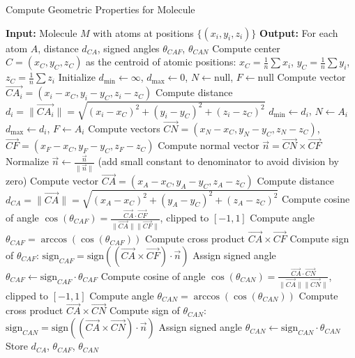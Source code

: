 \documentclass{article}
\begin{document}
\begin{algorithm}
\caption{Compute Geometric Properties for Molecule}
\begin{algorithmic}[1]
  \State \textbf{Input:} Molecule \( M \) with atoms at positions \( \{(x_i, y_i, z_i)\} \)
  \State \textbf{Output:} For each atom \( A \), distance \( d_{CA} \), signed angles \( \theta_{CAF} \), \( \theta_{CAN} \)
  \State Compute center \( C = (x_C, y_C, z_C) \) as the centroid of atomic positions: \( x_C = \frac{1}{n}\sum x_i \), \( y_C = \frac{1}{n}\sum y_i \), \( z_C = \frac{1}{n}\sum z_i \)
  \State Initialize \( d_{\text{min}} \gets \infty \), \( d_{\text{max}} \gets 0 \), \( N \gets \text{null} \), \( F \gets \text{null} \)
    \State Compute vector \( \vec{CA_i} = (x_i - x_C, y_i - y_C, z_i - z_C) \)
    \State Compute distance \( d_i = \| \vec{CA_i} \| = \sqrt{(x_i - x_C)^2 + (y_i - y_C)^2 + (z_i - z_C)^2} \)
      \State \( d_{\text{min}} \gets d_i \), \( N \gets A_i \)
    \EndIf
      \State \( d_{\text{max}} \gets d_i \), \( F \gets A_i \)
    \EndIf
  \EndFor
  \State Compute vectors \( \vec{CN} = (x_N - x_C, y_N - y_C, z_N - z_C) \), \( \vec{CF} = (x_F - x_C, y_F - y_C, z_F - z_C) \)
  \State Compute normal vector \( \vec{n} = \vec{CN} \times \vec{CF} \)
  \State Normalize \( \vec{n} \gets \frac{\vec{n}}{\| \vec{n} \|} \) (add small constant to denominator to avoid division by zero)
    \State Compute vector \( \vec{CA} = (x_A - x_C, y_A - y_C, z_A - z_C) \)
    \State Compute distance \( d_{CA} = \| \vec{CA} \| = \sqrt{(x_A - x_C)^2 + (y_A - y_C)^2 + (z_A - z_C)^2} \)
    \State Compute cosine of angle \( \cos(\theta_{CAF}) = \frac{\vec{CA} \cdot \vec{CF}}{\| \vec{CA} \| \| \vec{CF} \|} \), clipped to \([-1, 1]\)
    \State Compute angle \( \theta_{CAF} = \arccos\left( \cos(\theta_{CAF}) \right) \)
    \State Compute cross product \( \vec{CA} \times \vec{CF} \)
    \State Compute sign of \( \theta_{CAF} \): \( \text{sign}_{CAF} = \text{sign}\left( (\vec{CA} \times \vec{CF}) \cdot \vec{n} \right) \)
    \State Assign signed angle \( \theta_{CAF} \gets \text{sign}_{CAF} \cdot \theta_{CAF} \)
    \State Compute cosine of angle \( \cos(\theta_{CAN}) = \frac{\vec{CA} \cdot \vec{CN}}{\| \vec{CA} \| \| \vec{CN} \|} \), clipped to \([-1, 1]\)
    \State Compute angle \( \theta_{CAN} = \arccos\left( \cos(\theta_{CAN}) \right) \)
    \State Compute cross product \( \vec{CA} \times \vec{CN} \)
    \State Compute sign of \( \theta_{CAN} \): \( \text{sign}_{CAN} = \text{sign}\left( (\vec{CA} \times \vec{CN}) \cdot \vec{n} \right) \)
    \State Assign signed angle \( \theta_{CAN} \gets \text{sign}_{CAN} \cdot \theta_{CAN} \)
    \State Store \( d_{CA} \), \( \theta_{CAF} \), \( \theta_{CAN} \)
  \EndFor
\end{algorithmic}
\end{algorithm}
\end{document}
